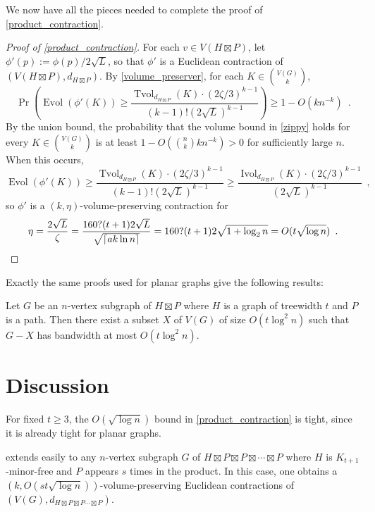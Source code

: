 \documentclass{patmorin}
\DeclareMathOperator{\evol}{Evol}
\DeclareMathOperator{\ivol}{Ivol}
\DeclareMathOperator{\tvol}{Tvol}
\begin{document}
We now have all the pieces needed to complete the proof of \cref{product_contraction}.

\begin{proof}[Proof of \cref{product_contraction}]
  For each $v\in V(H\boxtimes P)$, let $\phi'(p):=\phi(p)/2\sqrt{L}$, so that $\phi'$ is a Euclidean contraction of $(V(H\boxtimes P),d_{H\boxtimes P})$.  By \cref{volume_preserver}, for each $K\in \binom{V(G)}{k}$,
  \begin{equation}
    \Pr\left(\evol(\phi'(K)) \ge \frac{\tvol_{d_{H\boxtimes P}}(K)\cdot(2\zeta/3)^{k-1}}{(k-1)!(2\sqrt{L})^{k-1}}\right) \ge 1- O(kn^{-k}) \enspace .
    \label{zippy}
  \end{equation}
  By the union bound, the probability that the volume bound in \cref{zippy} holds for every $K\in\binom{V(G)}{k}$ is at least $1-O(\binom{n}{k}kn^{-k}) > 0$ for sufficiently large $n$.  When this occurs,
  \[
    \evol(\phi'(K)) \ge \frac{\tvol_{d_{H\boxtimes P}}(K)\cdot(2\zeta/3)^{k-1}}{(k-1)!(2\sqrt{L})^{k-1}} \ge
    \frac{\ivol_{d_{H\boxtimes P}}(K)\cdot(2\zeta/3)^{k-1}}{(2\sqrt{L})^{k-1}} \enspace ,
  \]
  so $\phi'$ is a $(k,\eta)$-volume-preserving contraction for
  \[
    \eta = \frac{2\sqrt{L}}{\zeta} = \frac{160?(t+1)2\sqrt{L}}{\sqrt{\lceil ak\ln n\rceil}} = {160?(t+1)2\sqrt{1+\log_2 n}} = O(t\sqrt{\log n}) \enspace . \qedhere
  \]
\end{proof}

Exactly the same proofs used for planar graphs give the following results:

\begin{thm}\label{product_bandwidth}
  Let $G$ be an $n$-vertex subgraph of $H\boxtimes P$ where $H$ is a graph of treewidth $t$ and $P$ is a path.  Then there exist a subset $X$ of $V(G)$ of size $O(t\log^{2} n)$ such that $G-X$ has bandwidth at most $O(t\log^2 n)$.
\end{thm}

\section{Discussion}

For fixed $t\ge 3$, the $O(\sqrt{\log n})$ bound in \cref{product_contraction} is tight, since it is already tight for planar graphs.

 extends easily to any $n$-vertex subgraph $G$ of $H\boxtimes P\boxtimes P\boxtimes\cdots\boxtimes P$ where $H$ is $K_{t+1}$-minor-free and $P$ appears $s$ times in the product.  In this case, one obtains a $(k,O(st\sqrt{\log n}))$-volume-preserving Euclidean contractions of $(V(G),d_{H\boxtimes P\boxtimes P\cdots\boxtimes P})$.
\end{document}
